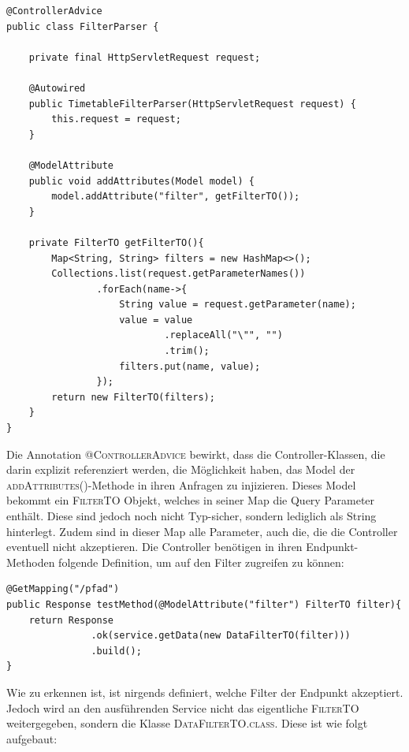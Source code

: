 \begin{lstlisting}[caption={Filterparser}]
@ControllerAdvice
public class FilterParser {

    private final HttpServletRequest request;

    @Autowired
    public TimetableFilterParser(HttpServletRequest request) {
        this.request = request;
    }

    @ModelAttribute
    public void addAttributes(Model model) {
        model.addAttribute("filter", getFilterTO());
    }

    private FilterTO getFilterTO(){
        Map<String, String> filters = new HashMap<>();
        Collections.list(request.getParameterNames())
                .forEach(name->{
                    String value = request.getParameter(name);
                    value = value
                            .replaceAll("\"", "")
                            .trim();
                    filters.put(name, value);
                });
        return new FilterTO(filters);
    }
}
\end{lstlisting}

Die Annotation \textsc{@ControllerAdvice} bewirkt, dass die Controller-Klassen, die darin explizit referenziert werden, die Möglichkeit haben, das Model der \textsc{addAttributes()}-Methode in ihren Anfragen zu injizieren. Dieses Model bekommt ein \textsc{FilterTO} Objekt, welches in seiner Map die Query Parameter enthält. Diese sind jedoch noch nicht Typ-sicher, sondern lediglich als String hinterlegt. Zudem sind in dieser Map alle Parameter, auch die, die die Controller eventuell nicht akzeptieren. Die Controller benötigen in ihren Endpunkt-Methoden folgende Definition, um auf den Filter zugreifen zu können:

\begin{lstlisting}[caption={Typischer Endpunkt mit eigener Lösung}]
@GetMapping("/pfad")
public Response testMethod(@ModelAttribute("filter") FilterTO filter){
    return Response
               .ok(service.getData(new DataFilterTO(filter)))
               .build();
}
\end{lstlisting}

Wie zu erkennen ist, ist nirgends definiert, welche Filter der Endpunkt akzeptiert. Jedoch wird an den ausführenden Service nicht das eigentliche \textsc{FilterTO} weitergegeben, sondern die Klasse \textsc{DataFilterTO.class}. Diese ist wie folgt aufgebaut:


